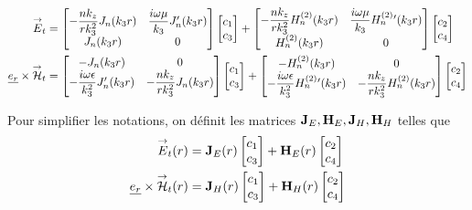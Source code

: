\begin{align}
    {\overset{\rightarrow}{E}}_t &= 
    \begin{bmatrix}
        -\dfrac{nk_z}{rk_3^2}J_n(k_3r) & \dfrac{i\omega\mu}{k_3}J_n'(k_3r)
        \\
        J_n(k_3r) & 0
    \end{bmatrix}
    \begin{bmatrix}
        c_1 \\
        c_3
    \end{bmatrix}
    +
    \begin{bmatrix}
        -\dfrac{nk_z}{rk_3^2}H_n^{(2)}(k_3r) & \dfrac{i\omega\mu}{k_3}H_n^{(2)}{}'(k_3r)
        \\
        H_n^{(2)}(k_3r) & 0
    \end{bmatrix}
    \begin{bmatrix}
        c_2 \\
        c_4
    \end{bmatrix}
    \\
    \underline{e_r}\times{\overset{\rightarrow}{\mathcal{H}}}_t &= 
    \begin{bmatrix}
        -J_n(k_3r) & 0
        \\
        -\dfrac{i\omega\epsilon}{k_3^2}J_n'(k_3r) & -\dfrac{nk_z}{rk_3^2}J_n(k_3r)
    \end{bmatrix}
    \begin{bmatrix}
        c_1 \\
        c_3
    \end{bmatrix}
    +
    \begin{bmatrix}
        -H_n^{(2)}(k_3r) & 0
        \\
        -\dfrac{i\omega\epsilon}{k_3^2}H_n^{(2)}{}'(k_3r) & -\dfrac{nk_z}{rk_3^2}H_n^{(2)}(k_3r)
    \end{bmatrix}
    \begin{bmatrix}
        c_2 \\
        c_4
    \end{bmatrix}
\end{align}

\newcommand{\mJ}{\mat{J}}
\newcommand{\mH}{\mat{H}}

Pour simplifier les notations, on définit les matrices $\mJ_{E},\mH_{E},\mJ_{H},\mH_{H}$ telles que
\begin{align}
    \vE_t(r) &= \mJ_{E}(r)
    \begin{bmatrix}
        c_1 \\
        c_3
    \end{bmatrix}
    +
    \mH_{E}(r)
    \begin{bmatrix}
        c_2 \\
        c_4
    \end{bmatrix}
    \\
    \v{e_r}\times\vH_t(r) &= 
    \mJ_{H}(r)
    \begin{bmatrix}
        c_1 \\
        c_3
    \end{bmatrix}
    +
    \mH_{H}(r)
    \begin{bmatrix}
        c_2 \\
        c_4
    \end{bmatrix}
\end{align}

